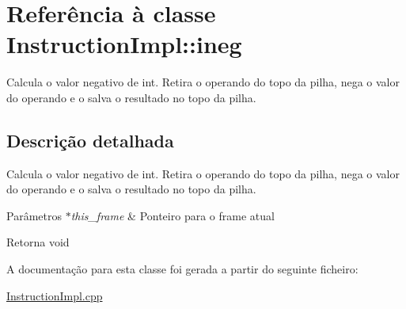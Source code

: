 \hypertarget{class_instruction_impl_1_1ineg}{}\section{Referência à classe Instruction\+Impl\+:\+:ineg}
\label{class_instruction_impl_1_1ineg}


Calcula o valor negativo de int. Retira o operando do topo da pilha, nega o valor do operando e o salva o resultado no topo da pilha.  




\subsection{Descrição detalhada}
Calcula o valor negativo de int. Retira o operando do topo da pilha, nega o valor do operando e o salva o resultado no topo da pilha. 


\begin{DoxyParams}{Parâmetros}
{\em $\ast$this\+\_\+frame} & Ponteiro para o frame atual \\
\hline
\end{DoxyParams}
\begin{DoxyReturn}{Retorna}
void 
\end{DoxyReturn}


A documentação para esta classe foi gerada a partir do seguinte ficheiro\+:\begin{DoxyCompactItemize}
\item 
\hyperlink{_instruction_impl_8cpp}{Instruction\+Impl.\+cpp}\end{DoxyCompactItemize}
